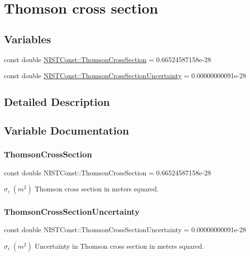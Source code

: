 \hypertarget{group___n_i_s_t_const-_thomson}{}\section{Thomson cross section}
\label{group___n_i_s_t_const-_thomson}
\subsection*{Variables}
\begin{DoxyCompactItemize}
\item 
const double \hyperlink{group___n_i_s_t_const-_thomson_gac0806b1a7f3e82009afeac7ea16728ce}{N\+I\+S\+T\+Const\+::\+Thomson\+Cross\+Section} = 0.\+66524587158e-\/28
\item 
const double \hyperlink{group___n_i_s_t_const-_thomson_ga550451740f39d6adccba7593d7ad497d}{N\+I\+S\+T\+Const\+::\+Thomson\+Cross\+Section\+Uncertainty} = 0.\+00000000091e-\/28
\end{DoxyCompactItemize}


\subsection{Detailed Description}


\subsection{Variable Documentation}
\mbox{\label{group___n_i_s_t_const-_thomson_gac0806b1a7f3e82009afeac7ea16728ce}} 
\subsubsection{\texorpdfstring{Thomson\+Cross\+Section}{ThomsonCrossSection}}
{\footnotesize\ttfamily const double N\+I\+S\+T\+Const\+::\+Thomson\+Cross\+Section = 0.\+66524587158e-\/28}

$\sigma_e \ (m^2)$ Thomson cross section in meters squared. \mbox{\label{group___n_i_s_t_const-_thomson_ga550451740f39d6adccba7593d7ad497d}} 
\subsubsection{\texorpdfstring{Thomson\+Cross\+Section\+Uncertainty}{ThomsonCrossSectionUncertainty}}
{\footnotesize\ttfamily const double N\+I\+S\+T\+Const\+::\+Thomson\+Cross\+Section\+Uncertainty = 0.\+00000000091e-\/28}

$\sigma_e \ (m^2)$ Uncertainty in Thomson cross section in meters squared. 